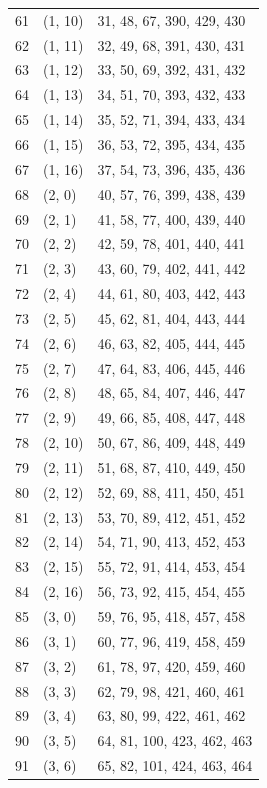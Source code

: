 \documentclass{article}
\begin{document}
\begin{longtable}{lll}
  61 & (1, 10) & 31, 48, 67, 390, 429, 430 \\
  62 & (1, 11) & 32, 49, 68, 391, 430, 431 \\
  63 & (1, 12) & 33, 50, 69, 392, 431, 432 \\
  64 & (1, 13) & 34, 51, 70, 393, 432, 433 \\
  65 & (1, 14) & 35, 52, 71, 394, 433, 434 \\
  66 & (1, 15) & 36, 53, 72, 395, 434, 435 \\
  67 & (1, 16) & 37, 54, 73, 396, 435, 436 \\
  68 & (2, 0) & 40, 57, 76, 399, 438, 439 \\
  69 & (2, 1) & 41, 58, 77, 400, 439, 440 \\
  70 & (2, 2) & 42, 59, 78, 401, 440, 441 \\
  71 & (2, 3) & 43, 60, 79, 402, 441, 442 \\
  72 & (2, 4) & 44, 61, 80, 403, 442, 443 \\
  73 & (2, 5) & 45, 62, 81, 404, 443, 444 \\
  74 & (2, 6) & 46, 63, 82, 405, 444, 445 \\
  75 & (2, 7) & 47, 64, 83, 406, 445, 446 \\
  76 & (2, 8) & 48, 65, 84, 407, 446, 447 \\
  77 & (2, 9) & 49, 66, 85, 408, 447, 448 \\
  78 & (2, 10) & 50, 67, 86, 409, 448, 449 \\
  79 & (2, 11) & 51, 68, 87, 410, 449, 450 \\
  80 & (2, 12) & 52, 69, 88, 411, 450, 451 \\
  81 & (2, 13) & 53, 70, 89, 412, 451, 452 \\
  82 & (2, 14) & 54, 71, 90, 413, 452, 453 \\
  83 & (2, 15) & 55, 72, 91, 414, 453, 454 \\
  84 & (2, 16) & 56, 73, 92, 415, 454, 455 \\
  85 & (3, 0) & 59, 76, 95, 418, 457, 458 \\
  86 & (3, 1) & 60, 77, 96, 419, 458, 459 \\
  87 & (3, 2) & 61, 78, 97, 420, 459, 460 \\
  88 & (3, 3) & 62, 79, 98, 421, 460, 461 \\
  89 & (3, 4) & 63, 80, 99, 422, 461, 462 \\
  90 & (3, 5) & 64, 81, 100, 423, 462, 463 \\
  91 & (3, 6) & 65, 82, 101, 424, 463, 464 \\

\end{longtable}
\end{document}
